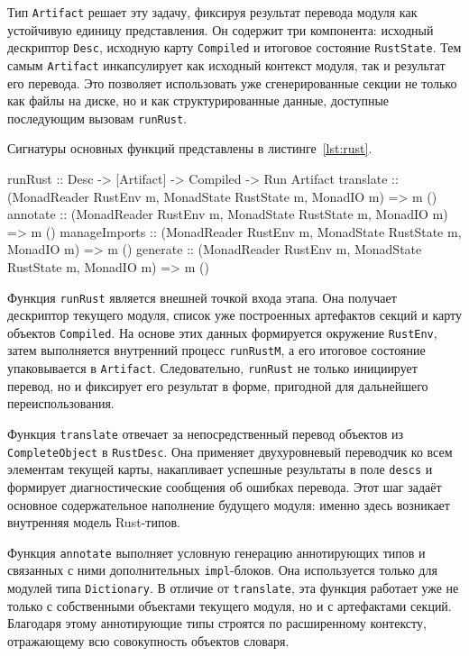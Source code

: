 \documentclass[a4paper,12pt]{article}
\begin{document}
Тип \texttt{Artifact} решает эту задачу, фиксируя результат перевода модуля как
устойчивую единицу представления. Он содержит три компонента: исходный дескриптор
\texttt{Desc}, исходную карту \texttt{Compiled} и итоговое состояние \texttt{RustState}.
Тем самым \texttt{Artifact} инкапсулирует как исходный контекст модуля, так и результат
его перевода. Это позволяет использовать уже сгенерированные секции не только как
файлы на диске, но и как структурированные данные, доступные последующим вызовам
\texttt{runRust}.

Сигнатуры основных функций представлены в листинге~\ref{lst:rust}.
\begin{flushleft}
\label{lst:rust}
\begin{MyCodes}
runRust :: Desc -> [Artifact] -> Compiled -> Run Artifact
translate :: (MonadReader RustEnv m, MonadState RustState m, MonadIO m)
          => m ()
annotate :: (MonadReader RustEnv m, MonadState RustState m, MonadIO m)
         => m ()
manageImports :: (MonadReader RustEnv m, MonadState RustState m, MonadIO m)
              => m ()
generate :: (MonadReader RustEnv m, MonadState RustState m, MonadIO m)
         => m ()
\end{MyCodes}
\end{flushleft}

Функция \texttt{runRust} является внешней точкой входа этапа. Она получает дескриптор
текущего модуля, список уже построенных артефактов секций и карту объектов
\texttt{Compiled}. На основе этих данных формируется окружение \texttt{RustEnv}, затем
выполняется внутренний процесс \texttt{runRustM}, а его итоговое состояние
упаковывается в \texttt{Artifact}. Следовательно, \texttt{runRust} не только инициирует
перевод, но и фиксирует его результат в форме, пригодной для дальнейшего
переиспользования.

Функция \texttt{translate} отвечает за непосредственный перевод объектов из
\texttt{CompleteObject} в \texttt{RustDesc}. Она применяет двухуровневый переводчик ко
всем элементам текущей карты, накапливает успешные результаты в поле \texttt{descs} и
формирует диагностические сообщения об ошибках перевода. Этот шаг задаёт основное
содержательное наполнение будущего модуля: именно здесь возникает внутренняя модель
Rust-типов.

Функция \texttt{annotate} выполняет условную генерацию аннотирующих типов и связанных с
ними дополнительных \texttt{impl}-блоков. Она используется только для модулей типа
\texttt{Dictionary}. В отличие от \texttt{translate}, эта функция работает уже не только
с собственными объектами текущего модуля, но и с артефактами секций. Благодаря этому
аннотирующие типы строятся по расширенному контексту, отражающему всю совокупность
объектов словаря.
\end{document}
